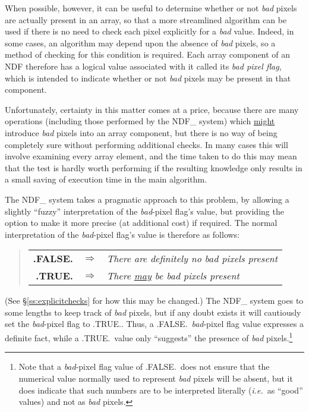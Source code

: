 \documentclass[twoside,11pt]{article}
\newcommand{\st}[1]{{\em{#1}}}
\begin{document}
When possible, however, it can be useful to determine whether or not
\st{bad\/} pixels are actually present in an array, so that a more
streamlined 
algorithm can be used if there is no need to check each pixel explicitly for
a \st{bad\/} value. 
Indeed, in some cases, an algorithm may depend upon the absence of \st{bad\/}
pixels, so a method of checking for this condition is required. 
Each array component of an NDF therefore has a logical value associated with
it called its \st{bad pixel flag}, which is intended to indicate whether or
not \st{bad\/} pixels may be present in that component. 

Unfortunately, certainty in this matter comes at a price, because there are
many operations (including those performed by the NDF\_ system) which
\underline{might} introduce \st{bad\/} pixels into an array component, but
there is no way of being completely sure without performing additional
checks. 
In many cases this will involve examining every array element, and the time
taken to do this may mean that the test is hardly worth performing if the
resulting knowledge only results in a small saving of execution time in the
main algorithm. 

The NDF\_ system takes a pragmatic approach to this problem, by allowing a
slightly ``fuzzy'' interpretation of the \st{bad\/}-pixel flag's value, but
providing the option to make it more precise (at additional cost) if
required. 
The normal interpretation of the \st{bad\/}-pixel flag's value is therefore
as follows: 

\small
\begin{quote}
\begin{center}
\begin{tabular}{rcl}
{\bf .FALSE.} & $\Rightarrow$ & \st{There are definitely no bad pixels 
present}\\
{\bf .TRUE.} & $\Rightarrow$ & \st{There \underline{may} be bad pixels
present} 
\end{tabular}
\end{center}
\end{quote}
\normalsize

(See \S\ref{ss:explicitchecks} for how this may be changed.)
The NDF\_ system goes to some lengths to keep track of \st{bad\/} pixels, but if
any doubt exists it will cautiously set the \st{bad\/}-pixel flag to .TRUE.. 
Thus, a .FALSE.\ \st{bad\/}-pixel flag value expresses a definite fact, while
a .TRUE.\ value only ``suggests'' the presence of \st{bad\/}
pixels.\footnote{Note that a \st{bad\/}-pixel flag value of .FALSE.\ does not
ensure that the numerical value normally used to represent \st{bad\/} pixels
will be absent, but it does indicate that such numbers are to be interpreted
literally (\st{i.e.}\ as ``good'' values) and not as \st{bad\/} pixels.} 
\end{document}
